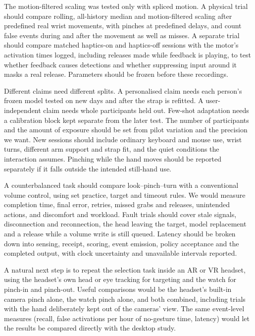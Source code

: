 \iffull
{}\label{physical-motion-and-haptics}
\fi

\iffull
The motion-filtered scaling was tested only with spliced motion. A physical trial should compare rolling, all-history median and motion-filtered scaling after predefined real wrist movements, with pinches at predefined delays, and count false events during and after the movement as well as misses. A separate trial should compare matched haptics-on and haptics-off sessions with the motor's activation times logged, including releases made while feedback is playing, to test whether feedback causes detections and whether suppressing input around it masks a real release. Parameters should be frozen before these recordings.
\fi

\iffull
{}\label{personalisation-and-generalisation}
\fi

\iffull
Different claims need different splits. A personalised claim needs each person's frozen model tested on new days and after the strap is refitted. A user-independent claim needs whole participants held out. Few-shot adaptation needs a calibration block kept separate from the later test. The number of participants and the amount of exposure should be set from pilot variation and the precision we want. New sessions should include ordinary keyboard and mouse use, wrist turns, different arm support and strap fit, and the quiet conditions the interaction assumes. Pinching while the hand moves should be reported separately if it falls outside the intended still-hand use.
\fi

\iffull
{}\label{interaction-and-physical-fault-trials}
\fi

\iffull
A counterbalanced task should compare look--pinch--turn with a conventional volume control, using set practice, target and timeout rules. We would measure completion time, final error, retries, missed grabs and releases, unintended actions, and discomfort and workload. Fault trials should cover stale signals, disconnection and reconnection, the head leaving the target, model replacement and a release while a volume write is still queued. Latency should be broken down into sensing, receipt, scoring, event emission, policy acceptance and the completed output, with clock uncertainty and unavailable intervals reported.
\fi

\iffull
{}\label{testing-in-a-headset}
\fi

\iffull
A natural next step is to repeat the selection task inside an AR or VR headset, using the headset's own head or eye tracking for targeting and the watch for pinch-in and pinch-out. Useful comparisons would be the headset's built-in camera pinch alone, the watch pinch alone, and both combined, including trials with the hand deliberately kept out of the cameras' view. The same event-level measures (recall, false activations per hour of no-gesture time, latency) would let the results be compared directly with the desktop study.

\fi